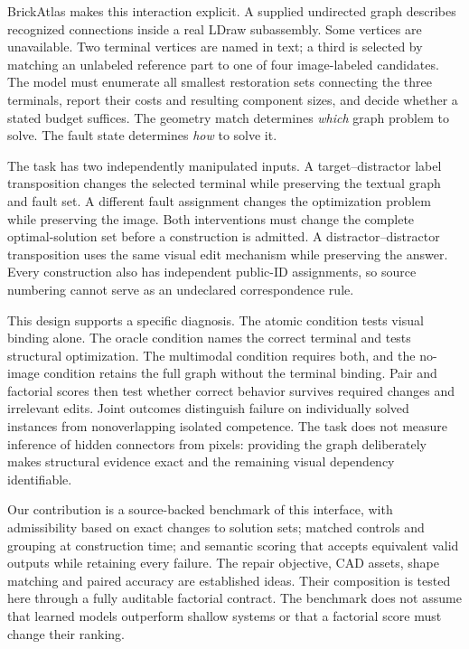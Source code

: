 \documentclass[10pt,twocolumn,letterpaper]{article}
\begin{document}
BrickAtlas makes this interaction explicit. A supplied undirected
graph describes recognized connections inside a real LDraw
subassembly. Some vertices are unavailable. Two terminal vertices
are named in text; a third is selected by matching an unlabeled
reference part to one of four image-labeled candidates.
The model must enumerate all smallest restoration sets connecting
the three terminals, report their costs and resulting component
sizes, and decide whether a stated budget suffices.
The geometry match determines \emph{which} graph problem to solve.
The fault state determines \emph{how} to solve it.

The task has two independently manipulated inputs.
A target--distractor label transposition changes the selected
terminal while preserving the textual graph and fault set.
A different fault assignment changes the optimization problem while
preserving the image. Both interventions must change the complete
optimal-solution set before a construction is admitted.
A distractor--distractor transposition uses the same visual edit
mechanism while preserving the answer. Every construction also
has independent public-ID assignments, so source numbering cannot
serve as an undeclared correspondence rule.

This design supports a specific diagnosis. The atomic condition
tests visual binding alone. The oracle condition names the correct
terminal and tests structural optimization. The multimodal condition
requires both, and the no-image condition retains the full graph
without the terminal binding. Pair and factorial scores then test
whether correct behavior survives required changes and irrelevant
edits. Joint outcomes distinguish failure on individually solved
instances from nonoverlapping isolated competence.
The task does not measure inference of hidden connectors
from pixels: providing the graph deliberately makes structural
evidence exact and the remaining visual dependency identifiable.

Our contribution is a source-backed benchmark of this interface,
with admissibility based on exact changes to solution sets; matched
controls and grouping at construction time; and semantic scoring
that accepts equivalent valid outputs while retaining every failure.
The repair objective, CAD assets, shape matching and paired accuracy
are established ideas. Their composition is tested here through a
fully auditable factorial contract. The benchmark does not assume
that learned models outperform shallow systems or that a factorial
score must change their ranking.
\end{document}
